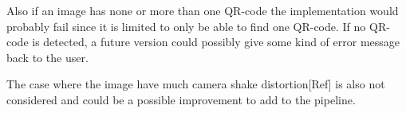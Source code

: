 \documentclass[12pt,a4paper]{article}
\begin{document}
Also if an image has none or more than one QR-code the implementation would probably fail since it is limited to only be able to find one QR-code. If no QR-code is detected, a future version could possibly give some kind of error message back to the user. 

The case where the image have much camera shake distortion[Ref] is also not considered and could be a possible improvement to add to the pipeline. 
 


{}

 
\end{document}
